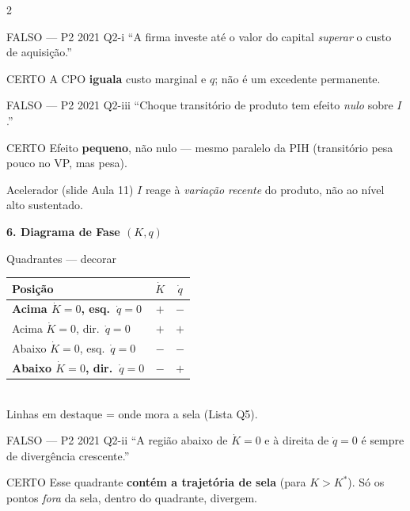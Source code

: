 \documentclass[10pt, a4paper]{article}
\begin{document}
\begin{multicols}{2}
\begin{errobox}{FALSO --- P2 2021 Q2-i}
``A firma investe até o valor do capital \emph{superar} o custo de aquisição.''
\end{errobox}
\vspace{0.3em}
\begin{certobox}{CERTO}
A CPO \textbf{iguala} custo marginal e $q$; não é um excedente permanente.
\end{certobox}

\begin{errobox}{FALSO --- P2 2021 Q2-iii}
``Choque transitório de produto tem efeito \emph{nulo} sobre $I$.''
\end{errobox}
\vspace{0.3em}
\begin{certobox}{CERTO}
Efeito \textbf{pequeno}, não nulo --- mesmo paralelo da PIH (transitório
pesa pouco no VP, mas pesa).
\end{certobox}

\begin{certobox}{Acelerador (slide Aula 11)}
$I$ reage à \emph{variação recente} do produto, não ao nível alto sustentado.
\end{certobox}

\vspace{0.5em}
\textbf{\color{azul}\large 6. Diagrama de Fase $(K,q)$}

\begin{certobox}{Quadrantes --- decorar}
\begin{tabular}{lcc}
\toprule
Posição & $\dot K$ & $\dot q$ \\
\midrule
\textbf{Acima $\dot K{=}0$, esq.\ $\dot q{=}0$} & $+$ & $-$ \\
Acima $\dot K{=}0$, dir.\ $\dot q{=}0$ & $+$ & $+$ \\
Abaixo $\dot K{=}0$, esq.\ $\dot q{=}0$ & $-$ & $-$ \\
\textbf{Abaixo $\dot K{=}0$, dir.\ $\dot q{=}0$} & $-$ & $+$ \\
\bottomrule
\end{tabular}\\
\small Linhas em destaque = onde mora a sela (Lista Q5).
\end{certobox}

\begin{errobox}{FALSO --- P2 2021 Q2-ii}
``A região abaixo de $\dot K=0$ e à direita de $\dot q=0$ é sempre de
divergência crescente.''
\end{errobox}
\vspace{0.3em}
\begin{certobox}{CERTO}
Esse quadrante \textbf{contém a trajetória de sela} (para $K>K^*$). Só os
pontos \emph{fora} da sela, dentro do quadrante, divergem.
\end{certobox}


\end{multicols}
\end{document}
